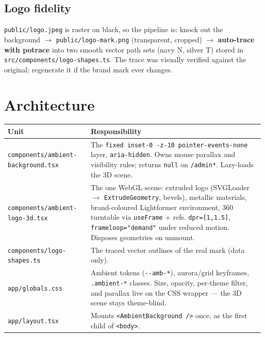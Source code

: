 \documentclass[11pt,a4paper]{article}
\begin{document}
\subsection{Logo fidelity}
\texttt{public/logo.jpeg} is raster on black, so the pipeline is: knock out the background
$\rightarrow$ \texttt{public/logo-mark.png} (transparent, cropped) $\rightarrow$
\textbf{auto-trace with potrace} into two smooth vector path sets (navy N, silver T) stored in
\texttt{src/components/logo-shapes.ts}. The trace was visually verified against the original;
regenerate it if the brand mark ever changes.

\section{Architecture}
\begin{center}
\begin{tabularx}{\textwidth}{l Y}
\toprule
\textbf{Unit} & \textbf{Responsibility}\\
\midrule
\texttt{components/ambient-background.tsx} & The \texttt{fixed inset-0 -z-10
pointer-events-none} layer, \texttt{aria-hidden}. Owns mouse parallax and visibility rules;
returns \texttt{null} on \texttt{/admin*}. Lazy-loads the 3D scene.\\
\texttt{components/ambient-logo-3d.tsx} & The one WebGL scene: extruded logo (SVGLoader
$\rightarrow$ \texttt{ExtrudeGeometry}, bevels), metallic materials, brand-coloured
Lightformer environment, 360\textdegree{} turntable via \texttt{useFrame} + refs.
\texttt{dpr=[1,1.5]}, \texttt{frameloop="demand"} under reduced motion. Disposes geometries on
unmount.\\
\texttt{components/logo-shapes.ts} & The traced vector outlines of the real mark (data only).\\
\texttt{app/globals.css} & Ambient tokens (\texttt{-{}-amb-*}), aurora/grid keyframes,
\texttt{.ambient-*} classes. Size, opacity, per-theme filter, and parallax live on the CSS
wrapper --- the 3D scene stays theme-blind.\\
\texttt{app/layout.tsx} & Mounts \texttt{<AmbientBackground />} once, as the first child of
\texttt{<body>}.\\
\bottomrule
\end{tabularx}
\end{center}
\end{document}
